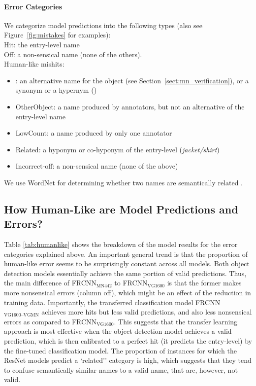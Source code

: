 \paragraph{Error Categories} We categorize model predictions into the following types (also see Figure~\ref{fig:mistakes} for examples):\\
Hit: the entry-level name\\
Off: a non-sensical name (none of the others). \\
Human-like mishits:
\begin{itemize}
\item \sameobject: an alternative name for the object (see Section~\ref{sect:mn_verification}), or a synonym or a hypernym ()
\item OtherObject: a name produced by annotators, but not an alternative of the entry-level name  
\item LowCount: a name produced by only one annotator
\item Related: a hyponym or co-hyponym of the entry-level (\textit{jacket/shirt})
\item Incorrect-off: a non-sensical name (none of the above)
\end{itemize}
We use WordNet for determining whether two names are semantically related   . 

\subsection{How Human-Like are Model Predictions and Errors?}

Table \ref{tab:humanlike} shows the breakdown of the model results for the error categories explained above. An important general trend is that the proportion of human-like error seems to be surprisingly constant across all models. 
Both object detection models essentially achieve the same portion of valid predictions. Thus, the main difference of FRCNN$_{\text{MN442}}$ to  FRCNN$_{\text{VG1600}}$ is that the former makes more nonsensical errors (column off), which might be an effect of the reduction in training data.
Importantly, the transferred classification model FRCNN$_{\text{VG1600--VGMN}}$ achieves more hits but less valid predictions, and also less nonsensical errors as compared to FRCNN$_{\text{VG1600}}$.
This suggests that the transfer learning approach is most effective when the object detection model achieves a valid prediction, which is then calibrated to a perfect hit (it predicts the entry-level) by the fine-tuned classification model.
The proportion of instances for which the ResNet models predict a `related'' category is high, which suggests that they tend to confuse semantically similar names to a valid name, that are, however, not valid. 


